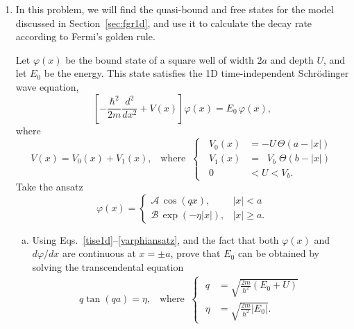 \documentclass[prx,12pt]{revtex4-2}
\begin{document}
\begin{enumerate}
  Using the above facts, show that the condition for a bound state to
  exist is
  \begin{equation}
    \frac{qj_\ell'(qa)}{j_\ell(qa)} = \frac{\gamma k_\ell'(\gamma a)}{k_\ell(\gamma a)},
  \end{equation}
  where $j_\ell'$ and $k_\ell'$ denote the derivatives of the relevant
  special functions, and $q$ and $\gamma$ depend on $E$ and $U$ as
  described above.  Write a program to search for the bound state
  energies at any given $a$ and $U$, and hence determine the
  conditions under which the potential does not support bound
  states.
\label{ex:boundstate3d}

\item
  \label{ex:1dfgr}
  In this problem, we will find the quasi-bound and free states for
  the model discussed in Section~\ref{sec:fgr1d}, and use it to
  calculate the decay rate according to Fermi's golden rule.

  Let $\varphi(x)$ be the bound state of a square well of width $2a$
  and depth $U$, and let $E_0$ be the energy.  This state satisfies
  the 1D time-independent Schr\"odinger wave equation,
  \begin{equation}
    \left[- \frac{\hbar^2}{2m} \frac{d^2}{dx^2} + V(x)\right] \varphi(x)
    = E_0\, \varphi(x),
    \label{tise1d}
  \end{equation}
  where
  \begin{equation}
    V(x) = V_0(x) + V_1(x), \;\;\;\mathrm{where}\;\;
    \left\{\;\;
    \begin{aligned}
      V_0(x) &= -U \, \Theta(a-|x|) \\
      V_1(x) &= \;\;V_b\; \Theta(b-|x|) \\
      0 &<U<V_b.
    \end{aligned}\right.
    \label{vx}
  \end{equation}
  Take the ansatz
  \begin{equation}
    \varphi(x) = \begin{cases}\mathcal{A}\,\cos(qx), & |x| < a \\
      \mathcal{B} \, \exp\left(-\eta|x|\right), & |x| \ge a.\end{cases}
    \label{varphiansatz}
  \end{equation}

  \begin{enumerate}[(a)]
  \item Using Eqs.~\eqref{tise1d}--\eqref{varphiansatz}, and the fact
    that both $\varphi(x)$ and $d\varphi/dx$ are continuous at $x =
    \pm a$, prove that $E_0$ can be obtained by solving the
    transcendental equation
    \begin{align}
      q \tan(qa) = \eta, \;\;\;\mathrm{where}\;\;
      \left\{\;
      \begin{aligned}
        q &= \sqrt{\frac{2m}{\hbar^2}(E_0+U)} \\
        \eta &= \sqrt{\frac{2m}{\hbar^2}|E_0|}.
      \end{aligned}\right.
      \label{qtanqa}
    \end{align}
  

\end{enumerate}
\end{enumerate}
\end{document}
